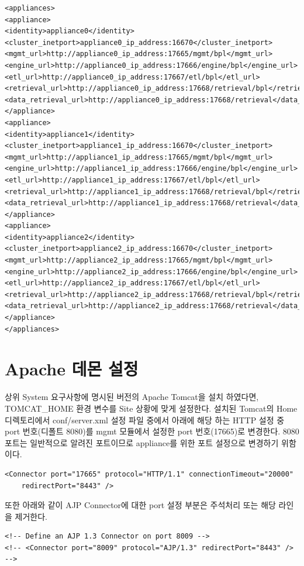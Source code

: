 \documentclass[11pt
  , a4paper
  , article
  , oneside
]{memoir}
\begin{document}
\begin{lstlisting}[style=termstyle]
<appliances>
<appliance>
<identity>appliance0</identity>
<cluster_inetport>appliance0_ip_address:16670</cluster_inetport>
<mgmt_url>http://appliance0_ip_address:17665/mgmt/bpl</mgmt_url>
<engine_url>http://appliance0_ip_address:17666/engine/bpl</engine_url>
<etl_url>http://appliance0_ip_address:17667/etl/bpl</etl_url>
<retrieval_url>http://appliance0_ip_address:17668/retrieval/bpl</retrieval_url>
<data_retrieval_url>http://appliance0_ip_address:17668/retrieval</data_retrieval_url>
</appliance>
<appliance>
<identity>appliance1</identity>
<cluster_inetport>appliance1_ip_address:16670</cluster_inetport>
<mgmt_url>http://appliance1_ip_address:17665/mgmt/bpl</mgmt_url>
<engine_url>http://appliance1_ip_address:17666/engine/bpl</engine_url>
<etl_url>http://appliance1_ip_address:17667/etl/bpl</etl_url>
<retrieval_url>http://appliance1_ip_address:17668/retrieval/bpl</retrieval_url>
<data_retrieval_url>http://appliance1_ip_address:17668/retrieval</data_retrieval_url>
</appliance>
<appliance>
<identity>appliance2</identity>
<cluster_inetport>appliance2_ip_address:16670</cluster_inetport>
<mgmt_url>http://appliance2_ip_address:17665/mgmt/bpl</mgmt_url>
<engine_url>http://appliance2_ip_address:17666/engine/bpl</engine_url>
<etl_url>http://appliance2_ip_address:17667/etl/bpl</etl_url>
<retrieval_url>http://appliance2_ip_address:17668/retrieval/bpl</retrieval_url>
<data_retrieval_url>http://appliance2_ip_address:17668/retrieval</data_retrieval_url>
</appliance>
</appliances>
\end{lstlisting}

\section{Apache 데몬 설정}
상위 System 요구사항에 명시된 버전의 Apache Tomcat을 설치 하였다면, TOMCAT\_HOME 환경 변수를 Site 상황에 맞게 설정한다. 설치된 Tomcat의 Home 디렉토리에서 conf/server.xml 설정 파일 중에서 아래에 해당 하는 HTTP 설정 중 port 번호(디폴트 8080)를 mgmt 모듈에서 설정한 port 번호(17665)로 변경한다. 8080 포트는 일반적으로 알려진 포트이므로 appliance를 위한 포트 설정으로 변경하기 위함이다.
\begin{lstlisting}[style=termstyle]
    <Connector port="17665" protocol="HTTP/1.1" connectionTimeout="20000"
    redirectPort="8443" />
\end{lstlisting}

또한 아래와 같이 AJP Connector에 대한 port 설정 부분은 주석처리 또는 해당 라인을 제거한다.
\begin{lstlisting}[style=termstyle]
<!-- Define an AJP 1.3 Connector on port 8009 -->
<!-- <Connector port="8009" protocol="AJP/1.3" redirectPort="8443" /> -->
\end{lstlisting}
\end{document}
